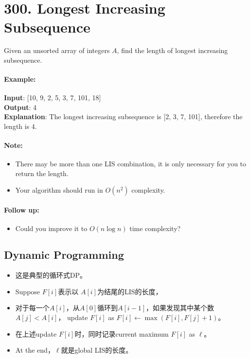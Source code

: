 \section{300. Longest Increasing Subsequence}
Given an unsorted array of integers $A$, find the length of longest increasing subsequence.

\paragraph{Example:}

\begin{flushleft}
\textbf{Input}: [10, 9, 2, 5, 3, 7, 101, 18]
\\
\textbf{Output}: 4 
\\
\textbf{Explanation}: The longest increasing subsequence is [2, 3, 7, 101], therefore the length is 4.
\end{flushleft} 

\paragraph{Note:}
\begin{itemize}
\item There may be more than one LIS combination, it is only necessary for you to return the length.
\item Your algorithm should run in $O(n^2)$ complexity.
\end{itemize}

\paragraph{Follow up:} 
\begin{itemize}
\item Could you improve it to $O(n \log n)$ time complexity?
\end{itemize}

\subsection{Dynamic Programming}
\begin{itemize}
\item 这是典型的循环式DP。
\item Suppose $F[i]$表示以 $A[i]$为结尾的LIS的长度，
\item 对于每一个$A[i]$，从$A[0]$循环到$A[i-1]$，如果发现其中某个数$A[j] < A[i]$， update $F[i]$ as $F[i]\gets \max(F[i], F[j] + 1)$。
\item 在上述update $F[i]$时，同时记录current maximum $F[i]$ as $\ell$。
\item At the end，$\ell$就是global LIS的长度。
\end{itemize}

